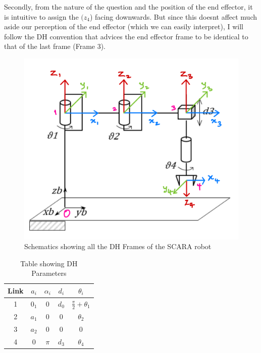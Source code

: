 \documentclass[12pt]{report}
\begin{document}
Secondly, from the nature of the question and the position of the end effector, it is intuitive to assign the $(z_4$) facing downwards. But since this doesnt affect much aside our perception of the end effector (which we can easily interpret), I will follow the DH convention that advices the end effector frame to be identical to that of the last frame (Frame 3).

\begin{figure}[H]
	\centering
	\includegraphics[scale=0.3]{6} %
	\caption{Schematics showing all the DH Frames of the SCARA robot}
	\label{fig:frame_all} %
\end{figure}

\begin{table}[h]
	\centering
	\caption{Table showing DH Parameters}
	\vspace{0.5cm}
	\label{tab:example}
	\begin{tabular}{|c|c|c|c|c|}
		\hline
		
		Link & $a_i$ & $\alpha_i$ & $d_i$ & $\theta_i$ \\
		\hline
		1 & $0_1$ & 0 & $d_0$ & $\frac{\pi}{2}+\theta_1$ \\
		2 & $a_1$ & 0 & 0 & $\theta_2$ \\
		3 & $a_2$ & 0 & 0 & 0 \\
		4 & 0 & $\pi$ & $d_3$ & $\theta_4$ \\
		\hline
	\end{tabular}
	
\end{table}
\end{document}
